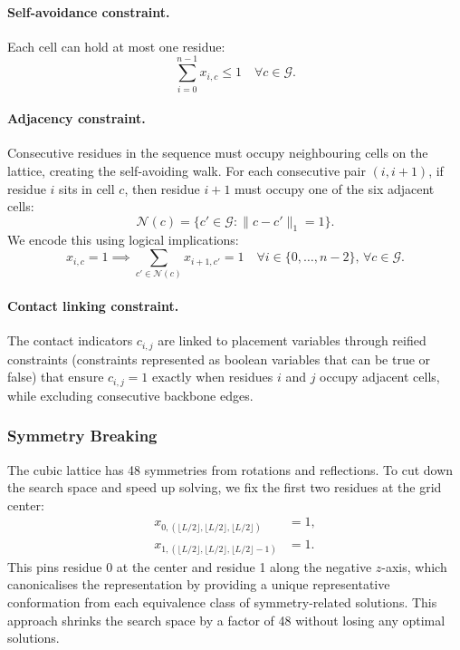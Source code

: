 \documentclass{article}
\theoremstyle{plain}
\theoremstyle{definition}
\begin{document}
\paragraph{Self-avoidance constraint.} Each cell can hold at most one residue:
\begin{equation}
\sum_{i=0}^{n-1} x_{i,c} \leq 1 \quad \forall c \in \mathcal{G}.
\end{equation}

\paragraph{Adjacency constraint.} Consecutive residues in the sequence must occupy neighbouring cells on the lattice, creating the self-avoiding walk. For each consecutive pair $(i, i+1)$, if residue $i$ sits in cell $c$, then residue $i+1$ must occupy one of the six adjacent cells:
\begin{equation}
\mathcal{N}(c) = \{c' \in \mathcal{G} : \|c - c'\|_1 = 1\}.
\end{equation}
We encode this using logical implications:
\begin{equation}
x_{i,c} = 1 \implies \sum_{c' \in \mathcal{N}(c)} x_{i+1,c'} = 1 \quad \forall i \in \{0, \ldots, n-2\}, \, \forall c \in \mathcal{G}.
\end{equation}

\paragraph{Contact linking constraint.} The contact indicators $c_{i,j}$ are linked to placement variables through reified constraints (constraints represented as boolean variables that can be true or false) that ensure $c_{i,j} = 1$ exactly when residues $i$ and $j$ occupy adjacent cells, while excluding consecutive backbone edges.

\subsubsection{Symmetry Breaking}

The cubic lattice has 48 symmetries from rotations and reflections. To cut down the search space and speed up solving, we fix the first two residues at the grid center:
\begin{align}
x_{0, (\lfloor L/2 \rfloor, \lfloor L/2 \rfloor, \lfloor L/2 \rfloor)} &= 1, \\
x_{1, (\lfloor L/2 \rfloor, \lfloor L/2 \rfloor, \lfloor L/2 \rfloor - 1)} &= 1.
\end{align}
This pins residue 0 at the center and residue 1 along the negative $z$-axis, which canonicalises the representation by providing a unique representative conformation from each equivalence class of symmetry-related solutions. This approach shrinks the search space by a factor of 48 without losing any optimal solutions.
\end{document}
